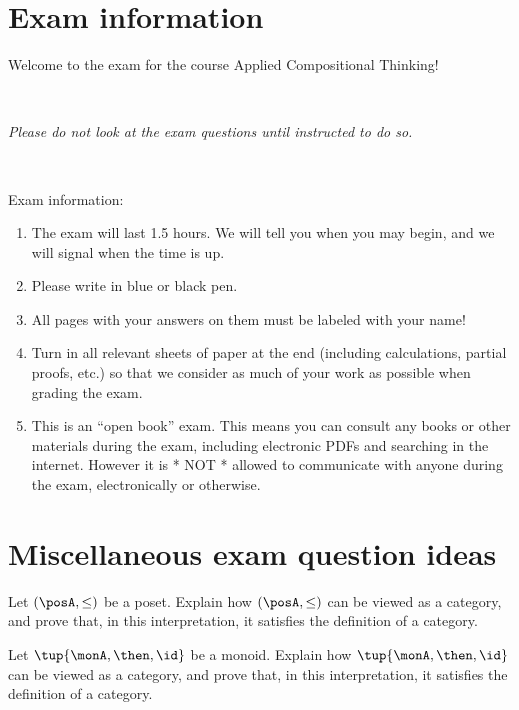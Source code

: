 \documentclass[paper=8.125in:10.250in,pagesize=pdftex,
    headinclude=false,footinclude=false,oneside,egregdoesnotlikesansseriftitles]{kaobook}
\begin{document}
\newpage

\section*{Exam information}


Welcome to the exam for the course Applied Compositional Thinking! 

\

\emph{Please do not look at the exam questions until instructed to do so.}

\

Exam information: 
\begin{enumerate}
\item The exam will last 1.5 hours. We will tell you when you may begin, and we will signal when the time is up. 
\item Please write in blue or black pen. 
\item All pages with your answers on them must be labeled with your name!
\item Turn in all relevant sheets of paper at the end (including calculations, partial proofs, etc.) so that we consider as much of your work as possible when grading the exam. 
\item This is an ``open book'' exam. This means you can consult any books or other materials during the exam, including electronic PDFs and searching in the internet. However it is * NOT * allowed to communicate with anyone during the exam, electronically or otherwise. 
\end{enumerate}

\newpage

\section*{Miscellaneous exam question ideas}

\begin{exercise}
Let $(\posA, \leq)$ be a poset. Explain how $(\posA, \leq)$ can be viewed as a category, and prove that, in this interpretation, it satisfies the definition of a category. 
\end{exercise}


\begin{exercise}
Let $\tup{\monA, \then, \id}$ be a monoid. Explain how $\tup{\monA, \then, \id}$ can be viewed as a category, and prove that, in this interpretation, it satisfies the definition of a category. 
\end{exercise}
\end{document}
